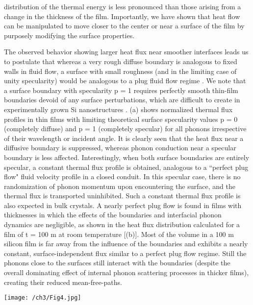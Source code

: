 distribution of the thermal energy is less pronounced than those arising from a change in the thickness of the film. Importantly, we have shown that heat flow can be manipulated to move closer to the center or near a surface of the film by purposely modifying the surface properties.
\par The observed behavior showing larger heat flux near smoother interfaces leads us to postulate that whereas a very rough diffuse boundary is analogous to fixed walls in fluid flow, a surface with small roughness (and in the limiting case of unity specularity) would be analogous to a plug fluid flow regime \cite{book_Bird}. We note that a surface boundary with specularity \gls{p} = 1 requires perfectly smooth thin-film boundaries devoid of any surface perturbations, which are difficult to create in experimentally grown Si nanostructures \cite{RN274,RN337}. (a) shows normalized thermal flux profiles in thin films with limiting theoretical surface specularity values \gls{p} = 0 (completely diffuse) and \gls{p} = 1 (completely specular) for all phonons irrespective of their wavelength or incident angle. It is clearly seen that the heat flux near a diffusive boundary is suppressed, whereas phonon conduction near a specular boundary is less affected. Interestingly, when both surface boundaries are entirely specular, a constant thermal flux profile is obtained, analogous to a ``perfect plug flow" fluid velocity profile in a closed conduit. In this specular case, there is no randomization of phonon momentum upon encountering the surface, and the thermal flux is transported uninhibited. Such a constant thermal flux profile is also expected in bulk crystals. A nearly perfect plug flow is found in films with thicknesses in which the effects of the boundaries and interfacial phonon dynamics are negligible, as shown in the heat flux distribution calculated for a film of \gls{t} = 100 \si{\micro}m at room temperature [(b)]. Most of the volume in a 100 \si{\micro}m silicon film is far away from the influence of the boundaries and exhibits a nearly constant, surface-independent flux similar to a perfect plug flow regime. Still the phonons close to the surfaces still interact with the boundaries (despite the overall dominating effect of internal phonon scattering processes in thicker films), creating their reduced mean-free-paths. %
\clearpage
\begin{sidewaysfigure}[hbt]
	\centering\texttt{[image: /ch3/Fig4.jpg]}
	\caption{Thermal flux profiles in Si thin films under a temperature gradient of 1\si{\kelvin\per\micro\meter} are shown as a function of temperature (\gls{T} = 100, 300, and 700 K) and thicknesses (\gls{t} = 10 nm, 100 nm, and 1 \si{\micro}m). Moving left to right, the thickness increases (upper panels) and the temperature decreases (lower panels). The central panel (b) shows the flux profiles at \gls{T} = 300 K and thickness \gls{t} = 100 nm. The surface roughness of the upper boundary is \gls{eta} = 4 nm and the roughness of the lower boundary is varied as \gls{eta} = 4 nm (blue), 0.5 nm (green), and 0.25 nm (red lines). The correlation length \gls{cl} is 10 times the roughness at both the surfaces.}
	\label{fig:ch3-results-flux}
\end{sidewaysfigure}
